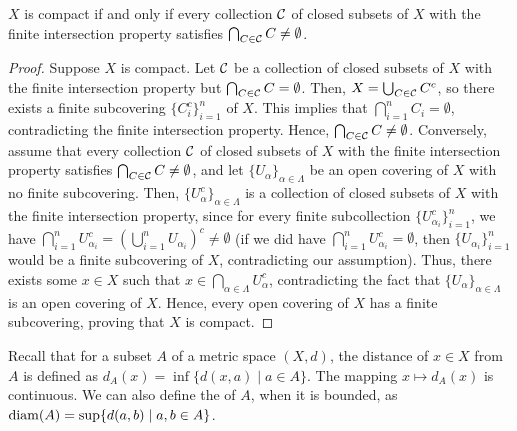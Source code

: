 \begin{theorem}
    $X$ is compact if and only if every collection $\mathcal{C}$ of closed subsets of $X$ with the finite intersection property satisfies $\bigcap_{C \in \mathcal{C}} C \neq \emptyset$.
\end{theorem}
\begin{proof}
    Suppose $X$ is compact. Let $\mathcal{C}$ be a collection of closed subsets of $X$ with the finite intersection property but $\bigcap_{C \in \mathcal{C}} C = \emptyset$. Then, $X = \bigcup_{C \in \mathcal{C}} C^{c}$, so there exists a finite subcovering $\{C_{i}^{c}\}_{i=1}^{n}$ of $X$. This implies that $\bigcap_{i=1}^{n} C_{i} = \emptyset$, contradicting the finite intersection property. Hence, $\bigcap_{C \in \mathcal{C}} C \neq \emptyset$. Conversely, assume that every collection $\mathcal{C}$ of closed subsets of $X$ with the finite intersection property satisfies $\bigcap_{C \in \mathcal{C}} C \neq \emptyset$, and let $\{U_{\alpha}\}_{\alpha \in \Lambda}$ be an open covering of $X$ with no finite subcovering. Then, $\{U_{\alpha}^{c}\}_{\alpha \in \Lambda}$ is a collection of closed subsets of $X$ with the finite intersection property, since for every finite subcollection $\{U_{\alpha_{i}}^{c}\}_{i=1}^{n}$, we have $\bigcap_{i=1}^{n} U_{\alpha_{i}}^{c} = \left(\bigcup_{i=1}^{n} U_{\alpha_{i}}\right)^{c} \neq \emptyset$ (if we did have $\bigcap_{i=1}^{n} U_{\alpha_{i}}^{c} = \emptyset$, then $\{U_{\alpha_{i}}\}_{i=1}^{n}$ would be a finite subcovering of $X$, contradicting our assumption). Thus, there exists some $x \in X$ such that $x \in \bigcap_{\alpha \in \Lambda} U_{\alpha}^{c}$, contradicting the fact that $\{U_{\alpha}\}_{\alpha \in \Lambda}$ is an open covering of $X$. Hence, every open covering of $X$ has a finite subcovering, proving that $X$ is compact.
\end{proof}

Recall that for a subset $A$ of a metric space $(X,d)$, the distance of $x \in X$ from $A$ is defined as $d_{A}(x) = \inf \{d(x,a) \mid a \in A\}$. The mapping $x \mapsto d_{A}(x)$ is continuous. We can also define the  of $A$, when it is bounded, as $\operatorname{diam}(A) = \sup \{d(a,b) \mid a,b \in A\}$.

